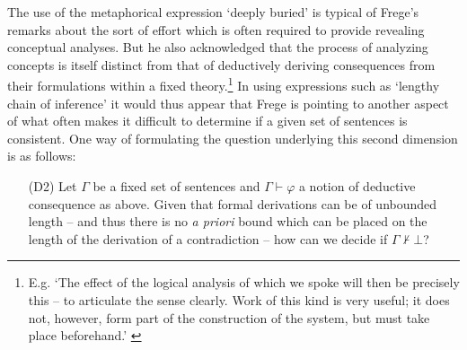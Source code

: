 \documentclass[11pt,fleqn,leqno]{article}
\def\phi{\varphi}
\def\proves{\vdash}
\begin{document}
The use of the metaphorical expression `deeply buried' is typical of Frege's remarks about the sort of effort which is often required to provide revealing conceptual analyses.  But he also acknowledged that the process of analyzing concepts is itself distinct from that of deductively deriving consequences from their formulations within a fixed theory.\footnote{E.g. `The effect of the logical analysis of which we spoke will then be precisely this -- to articulate the sense clearly. Work of this kind is very useful; it does not, however, form part of the construction of the system, but must take place beforehand.'  \citeyearpar[p. 211]{Frege1914a}}  In using expressions such as `lengthy chain of inference' it would thus appear that Frege is pointing to another aspect of what often makes it difficult to determine if a given set of sentences is consistent.   One way of formulating the question underlying this second dimension is as follows:
\begin{itemize}
\item[(D2)]  Let $\Gamma$ be a fixed set of sentences and $\Gamma \proves \phi$ a notion of deductive consequence as above.   Given that formal derivations can be of unbounded  length -- and thus there is no \textsl{a priori} bound which can be placed on the length of the derivation of a contradiction -- how can we decide if $\Gamma \not\proves \bot$?   
\end{itemize}
\end{document}
